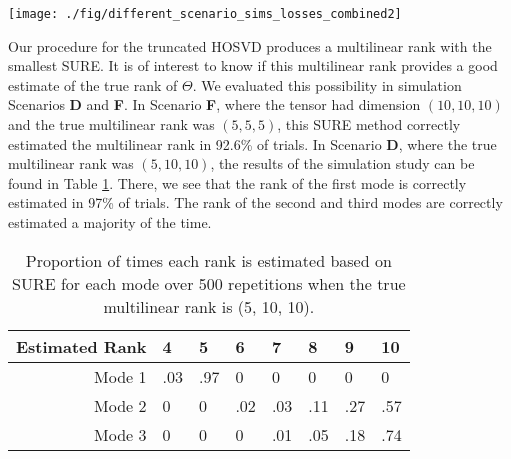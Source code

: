 \begin{figure*}
  \begin{center}
    \texttt{[image: ./fig/different\_scenario\_sims\_losses\_combined2]}
    \caption{Box plots of losses for the six estimators under different
      scenarios. The estimators include the mode-specific
      soft-thresholding (ST), truncated HOSVD (Tr), matrix
      soft-thresholding (MS), Efron-Morris (EM), James-Stein (JS), and
      maximum likelihood (X) estimators. In the scenarios, the mean tensor
      was simulated to have (\textbf{A}) uncorrelated elements,
      (\textbf{B}) full rank but dispersed singular values only along mode
      1, (\textbf{C}) AR-1 covariance along mode 1, (\textbf{D}) low rank
      only along mode 1, (\textbf{E}) full rank but dispersed singular
      values along all modes, and (\textbf{F}) rank $(5,5,5)$ with all the
      same non-zero singular values.}
    \label{fig:sim.results}
  \end{center}
\end{figure*}

Our procedure for the truncated HOSVD produces a multilinear rank with
the smallest SURE. It is of interest to know if this multilinear rank
provides a good estimate of the true rank of $\Theta$. We evaluated
this possibility in simulation Scenarios \textbf{D} and \textbf{F}. In
Scenario \textbf{F}, where the tensor had dimension $(10,10,10)$ and
the true multilinear rank was $(5,5,5)$, this SURE method correctly
estimated the multilinear rank in 92.6\% of trials. In Scenario
\textbf{D}, where the true multilinear rank was $(5,10,10)$, the
results of the simulation study can be found in Table
\ref{tab:rank.est}. There, we see that the rank of the first mode is
correctly estimated in 97\% of trials. The rank of the second and
third modes are correctly estimated a majority of the time.

\begin{table}[ht]
\centering
\begin{tabular}{rlllllll}
  \hline
 Estimated Rank & 4 & 5 & 6 & 7 & 8 & 9 & 10 \\
  \hline
Mode 1 & .03 & .97 & 0 & 0 & 0 & 0 & 0 \\
  Mode 2 & 0 & 0 & .02 & .03 & .11 & .27 & .57 \\
  Mode 3 & 0 & 0 & 0 & .01 & .05 & .18 & .74 \\
   \hline
\end{tabular}
\caption{Proportion of times each rank is estimated based on SURE for each mode over 500 repetitions when the true multilinear rank is (5, 10, 10).}
\label{tab:rank.est}
\end{table}
